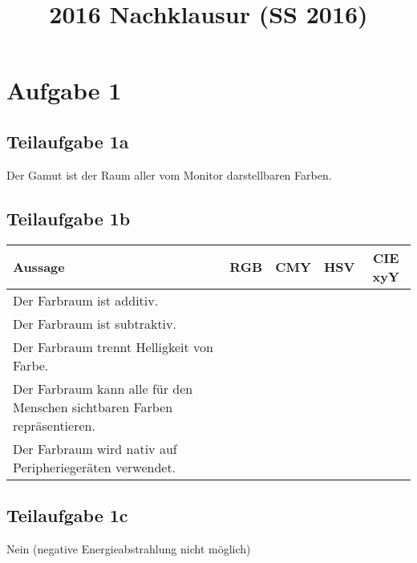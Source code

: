\documentclass[a4paper]{scrartcl}
\begin{document}
\title{2016 Nachklausur (SS 2016)}

\setcounter{section}{1}
\section*{Aufgabe 1}
\subsection*{Teilaufgabe 1a}
Der Gamut ist der Raum aller vom Monitor darstellbaren Farben.

\subsection*{Teilaufgabe 1b}
\begin{tabular}{p{7cm}cccc}\toprule
	\textbf{Aussage}                                                          & \textbf{RGB} & \textbf{CMY} & \textbf{HSV} & \textbf{CIE xyY}\\\midrule
	Der Farbraum ist additiv.                                                 & \CheckedBox  & \Square      & \Square      & \Square         \\
	Der Farbraum ist subtraktiv.                                              & \Square      & \CheckedBox  & \Square      & \Square         \\
	Der Farbraum trennt Helligkeit von Farbe.                                 & \Square      & \Square      & \CheckedBox  & \CheckedBox     \\
	Der Farbraum kann alle für den Menschen sichtbaren Farben repräsentieren. & \Square      & \Square      & \Square      & \CheckedBox     \\
	Der Farbraum wird nativ auf Peripheriegeräten verwendet.                  & \CheckedBox  & \CheckedBox  & \Square      & \Square         \\\bottomrule
\end{tabular}

\subsection*{Teilaufgabe 1c}
Nein (negative Energieabstrahlung nicht möglich)
\end{document}
